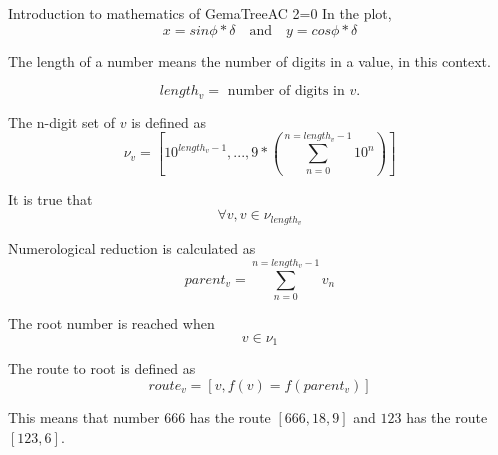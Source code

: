\documentclass[a4paper,10pt]{article}
\begin{document}
\begin{section}{Introduction to mathematics of GemaTreeAC 2=0}
     In the plot,
     \[
     x = sin\phi*\delta \quad \textrm{and} \quad y = cos\phi*\delta
     \]

     The length of a number means the number of digits in a value, in this context.

     \[
     length_v = \textrm{ number of digits in } v.
     \]

     The n-digit set of $v$ is defined as
     \[
     \nu_v = [10^{length_v-1}, ... , 9*(\sum_{n=0}^{n=length_v-1} 10^n)]
     \]

     It is true that
     \[
     \forall v, v \in \nu_{length_v}
     \]

     Numerological reduction is calculated as
     \[
     parent_v = \sum_{n=0}^{n=length_v-1}v_n
     \]

     The root number is reached when
     \[
     v \in \nu_1
     \]

     The route to root is defined as
     \[
     route_v = [v, f(v)=f(parent_v)]
     \]

     This means that number $666$ has the route $[666, 18, 9]$ and $123$ has the route $[123, 6]$.
     
   \end{section}
\end{document}
